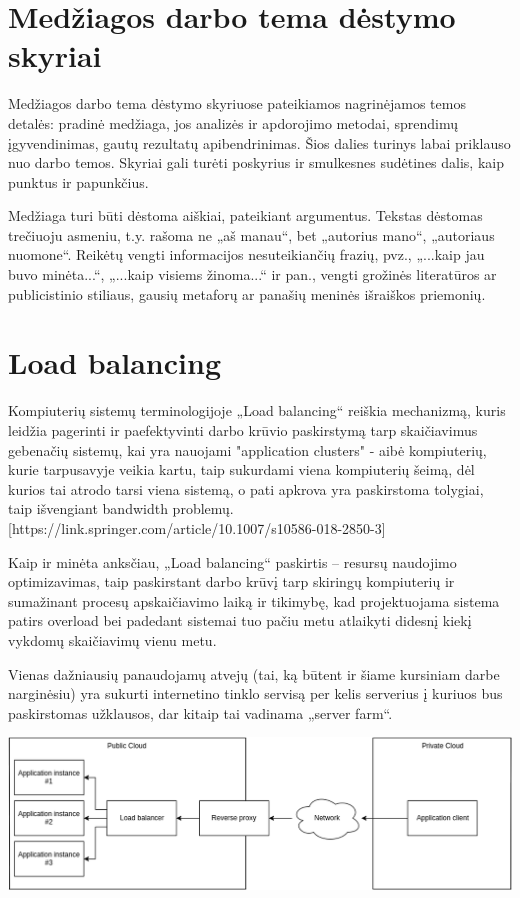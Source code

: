\documentclass{VUMIFPSkursinis}
\begin{document}
\section{Medžiagos darbo tema dėstymo skyriai}
Medžiagos darbo tema dėstymo skyriuose pateikiamos nagrinėjamos temos detalės:
pradinė medžiaga, jos analizės ir apdorojimo metodai, sprendimų įgyvendinimas,
gautų rezultatų apibendrinimas. Šios dalies turinys labai priklauso nuo darbo
temos. Skyriai gali turėti poskyrius ir smulkesnes sudėtines dalis, kaip
punktus ir papunkčius.

Medžiaga turi būti dėstoma aiškiai, pateikiant argumentus. Tekstas dėstomas
trečiuoju asmeniu, t.y. rašoma ne „aš manau“, bet „autorius mano“, „autoriaus
nuomone“. Reikėtų vengti informacijos nesuteikiančių frazių, pvz., „...kaip jau
buvo minėta...“, „...kaip visiems žinoma...“ ir pan., vengti grožinės literatūros
ar publicistinio stiliaus, gausių metaforų ar panašių meninės išraiškos
priemonių.


\section{Load balancing}
Kompiuterių sistemų terminologijoje „Load balancing“ reiškia mechanizmą, kuris leidžia pagerinti ir paefektyvinti darbo krūvio paskirstymą tarp skaičiavimus gebenačių sistemų, kai yra nauojami "application clusters" - aibė kompiuterių, kurie tarpusavyje veikia kartu, taip sukurdami viena kompiuterių šeimą, dėl kurios tai atrodo tarsi viena sistemą, o pati apkrova yra paskirstoma tolygiai, taip išvengiant bandwidth problemų.[https://link.springer.com/article/10.1007/s10586-018-2850-3]

Kaip ir minėta anksčiau, „Load balancing“ paskirtis – resursų naudojimo optimizavimas, taip paskirstant darbo krūvį tarp skiringų kompiuterių ir sumažinant procesų apskaičiavimo laiką ir tikimybę, kad projektuojama sistema patirs overload bei padedant sistemai tuo pačiu metu atlaikyti didesnį kiekį vykdomų skaičiavimų vienu metu.

Vienas dažniausių panaudojamų atvejų (tai, ką būtent ir šiame kursiniam darbe narginėsiu) yra sukurti internetino tinklo servisą per kelis serverius į kuriuos bus paskirstomas užklausos, dar kitaip tai vadinama „server farm“.

\graphicspath{ {./img/} }
 \includegraphics[width=150mm,scale=0.5]{load-balancing}
\end{document}
